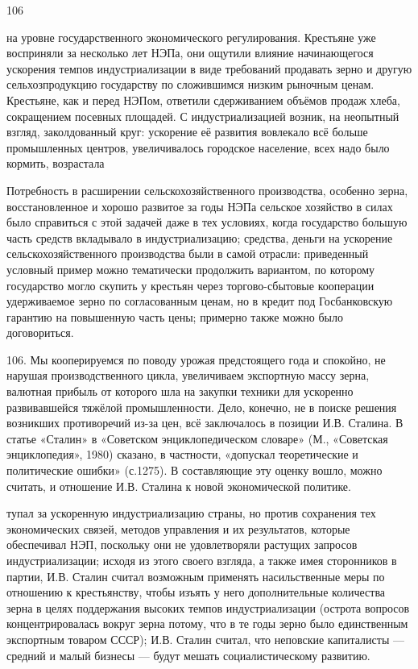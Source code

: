 106

на уровне государственного экономического регулирования. Крестьяне уже восприняли за несколько лет НЭПа, они ощутили влияние начинающегося ускорения темпов индустриализации в виде требований продавать зерно и другую сельхозпродукцию государству по сложившимся низким рыночным ценам. Крестьяне, как и перед НЭПом, ответили сдерживанием объёмов продаж хлеба, сокращением посевных площадей. С индустриализацией возник, на неопытный взгляд, заколдованный круг: ускорение её развития вовлекало всё больше промышленных центров, увеличивалось городское население, всех надо было кормить, возрастала

Потребность в расширении сельскохозяйственного производства, особенно зерна, восстановленное и хорошо развитое за годы НЭПа сельское хозяйство в силах было справиться с этой задачей даже в тех условиях, когда государство большую часть средств вкладывало в индустриализацию; средства, деньги на ускорение сельскохозяйственного производства были в самой отрасли: приведенный условный пример можно тематически продолжить вариантом, по которому государство могло скупить у крестьян через торгово-сбытовые кооперации удерживаемое зерно по согласованным ценам, но в кредит под Госбанковскую гарантию на повышенную часть цены; примерно также можно было договориться.

106. Мы кооперируемся по поводу урожая предстоящего года и спокойно, не нарушая производственного цикла, увеличиваем экспортную массу зерна, валютная прибыль от которого шла на закупки техники для ускоренно развивавшейся тяжёлой промышленности. Дело, конечно, не в поиске решения возникших противоречий из-за цен, всё заключалось в позиции И.В. Сталина. В статье «Сталин» в «Советском энциклопедическом словаре» (М., «Советская энциклопедия», 1980) сказано, в частности, «допускал теоретические и политические ошибки» (с.1275). В составляющие эту оценку вошло, можно считать, и отношение И.В. Сталина к новой экономической политике.

тупал за ускоренную индустриализацию страны, но против сохранения тех экономических связей, методов управления и их результатов, которые обеспечивал НЭП, поскольку они не удовлетворяли растущих запросов индустриализации; исходя из этого своего взгляда, а также имея сторонников в партии, И.В. Сталин считал возможным применять насильственные меры по отношению к крестьянству, чтобы изъять у него дополнительные количества зерна в целях поддержания высоких темпов индустриализации (острота вопросов концентрировалась вокруг зерна потому, что в те годы зерно было единственным экспортным товаром СССР); И.В. Сталин считал, что неповские капиталисты — средний и малый бизнесы — будут мешать социалистическому развитию.

